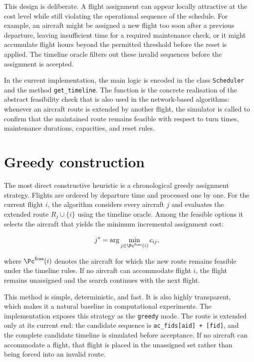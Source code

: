 This design is deliberate. A flight assignment can appear locally attractive at the cost level while still violating the operational sequence of the schedule. For example, an aircraft might be assigned a new flight too soon after a previous departure, leaving insufficient time for a required maintenance check, or it might accumulate flight hours beyond the permitted threshold before the reset is applied. The timeline oracle filters out these invalid sequences before the assignment is accepted.

In the current implementation, the main logic is encoded in the class \texttt{Scheduler} and the method \texttt{get\_timeline}. The function is the concrete realisation of the abstract feasibility check that is also used in the network-based algorithms: whenever an aircraft route is extended by another flight, the simulator is called to confirm that the maintained route remains feasible with respect to turn times, maintenance durations, capacities, and reset rules.

\section{Greedy construction}
\label{sec:heuristic_greedy}

The most direct constructive heuristic is a chronological greedy assignment strategy. Flights are ordered by departure time and processed one by one. For the current flight $i$, the algorithm considers every aircraft $j$ and evaluates the extended route $R_j \cup \{i\}$ using the timeline oracle. Among the feasible options it selects the aircraft that yields the minimum incremental assignment cost:

\begin{equation}
    j^{*} = \arg\min_{j\in\Pc^{\mathrm{feas}}(i)} c_{ij},
\end{equation}

where $\Pc^{\mathrm{feas}}(i)$ denotes the aircraft for which the new route remains feasible under the timeline rules. If no aircraft can accommodate flight $i$, the flight remains unassigned and the search continues with the next flight.

This method is simple, deterministic, and fast. It is also highly transparent, which makes it a natural baseline in computational experiments. The implementation exposes this strategy as the \texttt{greedy} mode. The route is extended only at its current end: the candidate sequence is \texttt{ac\_fids[aid] + [fid]}, and the complete candidate timeline is simulated before acceptance. If no aircraft can accommodate a flight, that flight is placed in the unassigned set rather than being forced into an invalid route.

